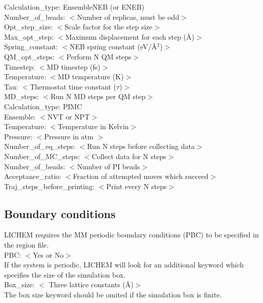 \documentclass[12pt]{report}
\begin{document}
Calculation\_type: EnsembleNEB (or ENEB) \\
Number\_of\_beads: $<$Number of replicas, must be odd$>$ \\
Opt\_step\_size: $<$Scale factor for the step size$>$ \\
Max\_opt\_step: $<$Maximum displacement for each step (\AA)$>$ \\
Spring\_constant: $<$NEB spring constant (eV/\AA$^2$)$>$ \\
QM\_opt\_steps: $<$Perform N QM steps$>$ \\
Timestep: $<$MD timestep (fs)$>$ \\
Temperature: $<$MD temperature (K)$>$ \\
Tau: $<$Thermostat time constant ($\tau$)$>$ \\
MD\_steps: $<$Run N MD steps per QM step$>$ \\

Calculation\_type: PIMC \\
Ensemble: $<$NVT or NPT$>$ \\
Temperature: $<$Temperature in Kelvin$>$ \\
Pressure: $<$Pressure in atm $>$ \\
Number\_of\_eq\_steps: $<$Run N steps before collecting data$>$ \\
Number\_of\_MC\_steps: $<$Collect data for N steps$>$ \\
Number\_of\_beads: $<$Number of PI beads$>$ \\
Acceptance\_ratio: $<$Fraction of attempted moves which succeed$>$ \\
Traj\_steps\_before\_printing: $<$Print every N steps$>$

\subsection{Boundary conditions}

LICHEM requires the MM periodic boundary conditions (PBC) to be specified in
the region file. \\

PBC: $<$Yes or No$>$ \\

If the system is periodic, LICHEM will look for an additional keyword
which specifies the size of the simulation box. \\

Box\_size: $<$ Three lattice constants (\AA)$>$ \\

The box size keyword should be omited if the simulation box is finite.
\end{document}
